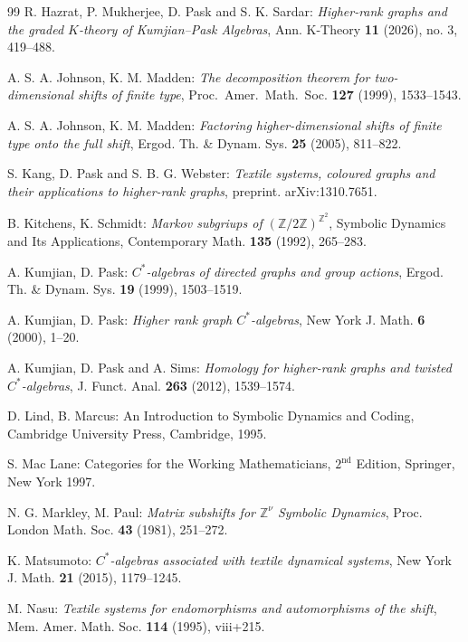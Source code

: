 \documentclass[a4paper,reqno,12pt]{amsart}
\theoremstyle{definition}
\theoremstyle{remark}
\begin{document}
\begin{thebibliography}{99}
R. Hazrat, P. Mukherjee, D. Pask and S. K. Sardar: \emph{Higher-rank graphs and the graded $K$-theory of Kumjian--Pask Algebras}, Ann. K-Theory \textbf{11} (2026), no. 3, 419--488.

A. S. A. Johnson, K. M. Madden: \emph{The decomposition theorem for two-dimensional shifts of finite type}, Proc.\ Amer.\ Math.\ Soc. \textbf{127} (1999), 1533--1543.

A. S. A. Johnson, K. M. Madden: \emph{Factoring higher-dimensional shifts of finite type onto the full shift}, Ergod. Th. \& Dynam. Sys. \textbf{25} (2005), 811--822.

S. Kang, D. Pask and S. B. G. Webster: \emph{Textile systems, coloured graphs and their applications to higher-rank graphs}, preprint. arXiv:1310.7651.

B. Kitchens, K. Schmidt: \emph{Markov subgriups of $(\mathbb{Z}/2\mathbb{Z})^{\mathbb{Z}^2}$}, Symbolic Dynamics and Its Applications, Contemporary Math. \textbf{135} (1992), 265--283.

A. Kumjian, D. Pask: \emph{$C^*$-algebras of directed graphs and group actions}, Ergod. Th. \& Dynam. Sys. \textbf{19} (1999), 1503--1519.

A. Kumjian, D. Pask: \emph{Higher rank graph $C^*$-algebras}, New York J. Math. \textbf{6} (2000), 1--20.

A. Kumjian, D. Pask and A. Sims: \emph{Homology for higher-rank graphs and twisted $C^*$-algebras}, J. Funct. Anal. \textbf{263} (2012), 1539--1574.

D. Lind, B. Marcus: An Introduction to Symbolic Dynamics and Coding, Cambridge University Press, Cambridge, 1995. 

S. Mac Lane: Categories for the Working Mathematicians, $2^{\text{nd}}$ Edition, Springer, New York 1997.

N. G. Markley, M. Paul: \emph{Matrix subshifts for $\mathbb{Z}^\nu$ Symbolic Dynamics}, Proc. London Math. Soc. \textbf{43} (1981), 251--272.

K. Matsumoto: \emph{$C^*$-algebras associated with textile dynamical systems}, New York J. Math. \textbf{21} (2015), 1179--1245.

M. Nasu: \emph{Textile systems for endomorphisms and automorphisms of the shift}, Mem. Amer. Math. Soc. \textbf{114} (1995), viii+215.


\end{thebibliography}
\end{document}
